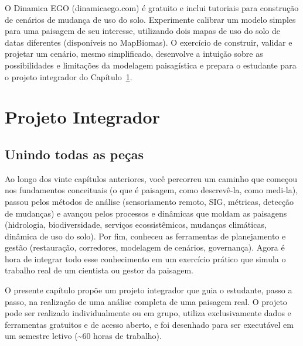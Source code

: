 \documentclass[
  portuguese,
  11pt,
  a4paper,
  open=any]{scrbook}
\begin{document}
\begin{tcolorbox}[enhanced jigsaw, colbacktitle=quarto-callout-tip-color!10!white, coltitle=black, opacityback=0, breakable, left=2mm, colback=white, bottomtitle=1mm, toptitle=1mm, titlerule=0mm, arc=.35mm, opacitybacktitle=0.6, leftrule=.75mm, colframe=quarto-callout-tip-color-frame, title=\textcolor{quarto-callout-tip-color}{\faLightbulb}\hspace{0.5em}{Para aprofundar}, rightrule=.15mm, bottomrule=.15mm, toprule=.15mm]

O Dinamica EGO (dinamicaego.com) é gratuito e inclui tutoriais para
construção de cenários de mudança de uso do solo. Experimente calibrar
um modelo simples para uma paisagem de seu interesse, utilizando dois
mapas de uso do solo de datas diferentes (disponíveis no MapBiomas). O
exercício de construir, validar e projetar um cenário, mesmo
simplificado, desenvolve a intuição sobre as possibilidades e limitações
da modelagem paisagística e prepara o estudante para o projeto
integrador do Capítulo~\ref{sec-projeto}.

\end{tcolorbox}

\chapter{Projeto Integrador}\label{sec-projeto}

\section{Unindo todas as peças}\label{unindo-todas-as-peuxe7as}

Ao longo dos vinte capítulos anteriores, você percorreu um caminho que
começou nos fundamentos conceituais (o que é paisagem, como descrevê-la,
como medi-la), passou pelos métodos de análise (sensoriamento remoto,
SIG, métricas, detecção de mudanças) e avançou pelos processos e
dinâmicas que moldam as paisagens (hidrologia, biodiversidade, serviços
ecossistêmicos, mudanças climáticas, dinâmica de uso do solo). Por fim,
conheceu as ferramentas de planejamento e gestão (restauração,
corredores, modelagem de cenários, governança). Agora é hora de integrar
todo esse conhecimento em um exercício prático que simula o trabalho
real de um cientista ou gestor da paisagem.

O presente capítulo propõe um projeto integrador que guia o estudante,
passo a passo, na realização de uma análise completa de uma paisagem
real. O projeto pode ser realizado individualmente ou em grupo, utiliza
exclusivamente dados e ferramentas gratuitos e de acesso aberto, e foi
desenhado para ser executável em um semestre letivo (\textasciitilde60
horas de trabalho).
\end{document}
